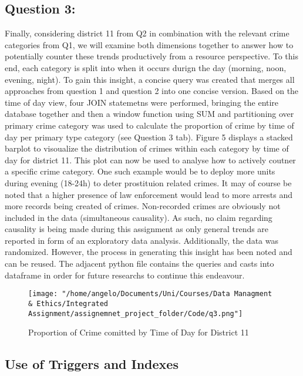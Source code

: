 \documentclass[a4paper]{article}
\begin{document}
 



\subsection{Question 3:}



Finally, considering district 11 from Q2 in combination with the relevant crime categories from Q1, we will examine both dimensions together to answer how to potentially counter these trends productively from a resource perspective. To this end, each category is split into when it occurs durign the day (morning, noon, evening, night).
To gain this insight, a concise query was created that merges all approaches from question 1 and question 2 into one concise version. Based on the time of day view, four JOIN statemetns were performed, bringing the entire database together and then a window function using SUM and partitioning over primary crime category was used to calculate the proportion of crime by time of day per primary type category (see Question 3 tab).
Figure 5 displays a stacked barplot to visoualize the distribution of crimes within each category by time of day for district 11. This plot can now be used to analyse how to actively coutner a specific crime category. One such example would be to deploy more units during evening (18-24h) to deter prostituion related crimes. It may of course be noted that a higher presence of law enforcement would lead to more arrests and more records being created of crimes. Non-recorded crimes are obviously not included in the data (simultaneous causality). As such, no claim regarding causality is being made during this assignment as only general trends are reported in form of an exploratory data analysis. Additionally, the data was randomized. However, the process in generating this insight has been noted and can be reused. The adjacent python file contains the queries and casts into dataframe in order for future researchs to continue this endeavour. 


\begin{figure}[htp]
		\centering
			\texttt{[image: "/home/angelo/Documents/Uni/Courses/Data Managment \& Ethics/Integrated Assignment/assignemnet\_project\_folder/Code/q3.png"]}
         \small
         \caption{Proportion of Crime comitted by Time of Day for District 11}
\end{figure}



\subsection{Use of Triggers and Indexes}
\end{document}
